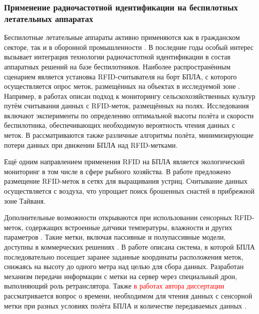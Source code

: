 \documentclass[12pt]{article}
\theoremstyle{definition}
\begin{document}
\subsubsection{Применение радиочастотной идентификации на беспилотных летательных аппаратах}\label{sec:UAV}

Беспилотные летательные аппараты активно применяются как в гражданском секторе, так и в оборонной промышленности \cite{Choi2023, Mohsan2023, Gope2021}. В последние годы особый интерес вызывает интеграция технологии радиочастотной идентификации в состав аппаратных решений на базе беспилотников. Наиболее распространённым сценарием является установка RFID-считывателя на борт БПЛА, с которого осуществляется опрос меток, размещённых на объектах в исследуемой зоне \cite{Motroni2023, Stasa2025}. Например, в работах \cite{Quino2021,Quino2022} описан подход к мониторингу сельскохозяйственных культур путём считывания данных с RFID-меток, размещённых на полях. Исследования включают эксперименты по определению оптимальной высоты полёта и скорости беспилотника, обеспечивающих необходимую вероятность чтения данных с меток. В \cite{Quino2022} рассматриваются также различные алгоритмы полёта, минимизирующие потери данных при движении БПЛА над RFID-метками.

Ещё одним направлением применения RFID на БПЛА является экологический мониторинг \cite{LeBreton2024} в том числе в сфере рыбного хозяйства. В работе \cite{Yang2017} предложено размещение RFID-меток в сетях для выращивания устриц. Считывание данных осуществляется с воздуха, что упрощает поиск брошенных снастей в прибрежной зоне Тайваня.

Дополнительные возможности открываются при использовании сенсорных RFID-меток, содержащих встроенные датчики температуры, влажности и других параметров \cite{Gortschacher2019, Kudyba2025, Mulloni2024, Abbas2025}. Такие метки, включая пассивные и полупассивные модели, доступны в коммерческих решениях \cite{atlasrfidstore_site, dipolerfid_site}. В работе \cite{Wang2015} описана система, в которой БПЛА последовательно посещает заранее заданные координаты расположения меток, снижаясь на высоту до одного метра над целью для сбора данных. Разработан механизм передачи информации с метки на сервер через специальный дрон, выполняющий роль ретранслятора. Также \textcolor{red}{в работах автора диссертации} рассматривается вопрос о времени, необходимом для чтения данных с сенсорной метки при разных условиях полёта БПЛА и количестве передаваемых данных \cite{Abramian2024, Abramian2025}.
\end{document}

